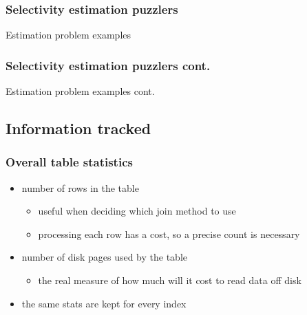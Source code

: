 \documentclass{beamer}
\begin{document}
\begin{frame}[label=puzzlers]
  \frametitle<1>{Selectivity estimation puzzlers}

  \begin{block}{Estimation problem examples}
    
  \end{block}
\end{frame}

\begin{frame}[label=puzzlers-2]
  \frametitle<1>{Selectivity estimation puzzlers cont.}

  \begin{block}{Estimation problem examples cont.}
    
  \end{block}
\end{frame}

\subsection{Information tracked}

\begin{frame}
  \frametitle{Overall table statistics}

  \begin{itemize}
  \item number of \alert{rows} in the table
    \begin{itemize}
    \item useful when deciding which join method to use
    \item processing each row has a cost, so a precise count is necessary
    \end{itemize}
  \item number of \alert{disk pages} used by the table
    \begin{itemize}
    \item the real measure of how much will it cost to \alert{read data off disk}
    \end{itemize}
  \item the same stats are kept for every \alert{index}
  \end{itemize}
\end{frame}
\end{document}
